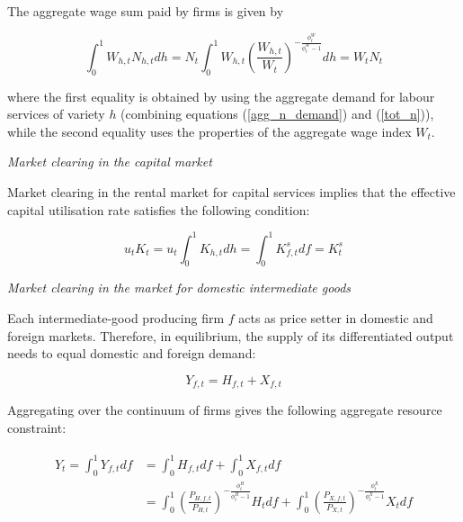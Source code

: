 \documentclass[a4paper,11pt]{article}
\numberwithin{equation}{section}
\begin{document}
	The aggregate wage sum paid by firms is given by
	
	\begin{equation}
	\int_{0}^{1}W_{h,t}N_{h,t}dh=N_t\int_{0}^{1}W_{h,t}\left(\frac{W_{h,t}}{W_t}\right)^{-\frac{\phi_t^W}{\phi_t^W-1}}dh=W_tN_t
	\end{equation}
	
	where the first equality is obtained by using the aggregate demand for labour services of variety $h$ (combining equations (\ref{agg_n_demand}) and (\ref{tot_n})), while the second equality uses the properties of the aggregate wage index $W_t$.
	
	\vspace{8pt}
	\textit{Market clearing in the capital market}
	\vspace{8pt}
	
	Market clearing in the rental market for capital services implies that the effective capital utilisation rate satisfies the following condition:
	
	\begin{equation} \label{market_k}
	u_tK_t=u_t\int_{0}^{1}K_{h,t}dh=\int_{0}^{1}K_{f,t}^sdf=K_t^s
	\end{equation}
	
	\vspace{8pt}
	\textit{Market clearing in the market for domestic intermediate goods}
	\vspace{8pt}
	
	Each intermediate-good producing firm $f$ acts as price setter in domestic and foreign markets. Therefore, in equilibrium, the supply of its differentiated output needs to equal domestic and foreign demand:
	
	\begin{equation}
	Y_{f,t}=H_{f,t}+X_{f,t}
	\end{equation}
	
	Aggregating over the continuum of firms gives the following aggregate resource constraint:
	
	\begin{align} \label{agg_y_real}
	\begin{split}
	Y_t=\int_{0}^{1}Y_{f,t}df &= \int_{0}^{1}H_{f,t}df+\int_{0}^{1}X_{f,t}df \\
							  &= \int_{0}^{1}\left(\frac{P_{H,f,t}}{P_{H,t}}\right)^{-\frac{\phi_t^H}{\phi_t^H-1}}H_tdf+\int_{0}^{1}\left(\frac{P_{X,f,t}}{P_{X,t}}\right)^{-\frac{\phi_t^X}{\phi_t^X-1}}X_tdf\\
	\end{split}
	\end{align}
	
\end{document}
